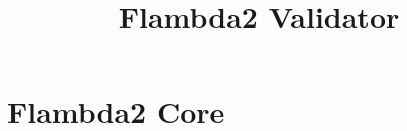 \documentclass[11pt,fleqn]{amsart}
\begin{document}
\title{Flambda2 Validator}
\date{}
\maketitle{}


\section{Flambda2 Core}

\newcommand{\expr}{\mathit{exp}}
\newcommand{\var}{\mathit{var}}
\newcommand{\named}{\mathit{named}}
\newcommand{\arms}{\mathit{arms}}
\newcommand{\codeid}{\mathit{id}}
\newcommand{\code}{\mathit{code}}
\newcommand{\setofclo}{P}
\newcommand{\block}{\mathit{block}}
\newcommand{\blockpat}{\mathit{b}}
\newcommand{\simple}{\mathit{simple}}
\newcommand{\prim}{\mathit{prim}}
\newcommand{\staticconsts}{\chi}
\newcommand{\recinfo}{\mathsf{rec\_info}}
\newcommand{\idexpr}{\mathit{id\_exp}}
\newcommand{\symb}{\mathit{symbol}}
\newcommand{\const}{\mathit{const}}
\newcommand{\callid}{\kappa}
\newcommand{\direct}{\mathsf{direct}}
\newcommand{\indirect}{\mathsf{indirect}}
\newcommand{\method}{\mathsf{method}}
\newcommand{\ccall}{\mathsf{c\_call}}
\newcommand{\blockconst}[3]{\mathsf{block}(#1,\,#2,\,#3)}

\newcommand{\sep}{\; | \;}
\newcommand{\letexp}[3]{\mathsf{let}\; #1 \; = \; #2 \; \mathsf{in} \; #3}
\newcommand{\letcodeexp}[3]{\mathsf{let}\; (\mathsf{code}^{\uparrow} \; #1) \; = \; #2 \; \mathsf{in} \; #3}
\newcommand{\letcloexp}[3]{\mathsf{let}\; (\mathsf{clo} \; #1) \; = \; #2 \; \mathsf{in} \; #3}
\newcommand{\letstaticcloexp}[3]{\mathsf{let}\; (\mathsf{clo}^{\uparrow} \; #1) \; = \; #2 \; \mathsf{in} \; #3}
\newcommand{\letblockexp}[3]{\mathsf{let}\; (\mathsf{block}^{\uparrow} \; #1) \; = \; #2 \; \mathsf{in} \; #3}
\newcommand{\subst}[3]{#1 \; [ #2 \setminus #3 ]}
\newcommand{\letcont}[4]{#1 \; \mathsf{where} \; #2 \; #3 \; = \; #4}
\newcommand{\step}{\longrightarrow}
\newcommand{\applycont}[2]{#1 \; #2}
\newcommand{\apply}[5]{\mathsf{call}(#1) \; \mathsf{with} \; (#2, \, #3, \, #4, \, #5)}
\newcommand{\abst}[2]{\lambda \; #1.\, #2}
\newcommand{\switch}[2]{\mathsf{switch}\; (#1) \; #2}
\newcommand{\args}[1]{\overrightarrow{#1}}
\newcommand{\substchain}[2]{\; [ #1 \setminus #2 ]}
\newcommand{\invalid}{\mathsf{invalid}}
\newcommand{\load}[3]{\mathsf{load}(#1,\,#2,\,#3)}
\newcommand{\makeblock}[3]{\mathsf{make\_block}(#1,\,#2,\,#3)}
\end{document}

